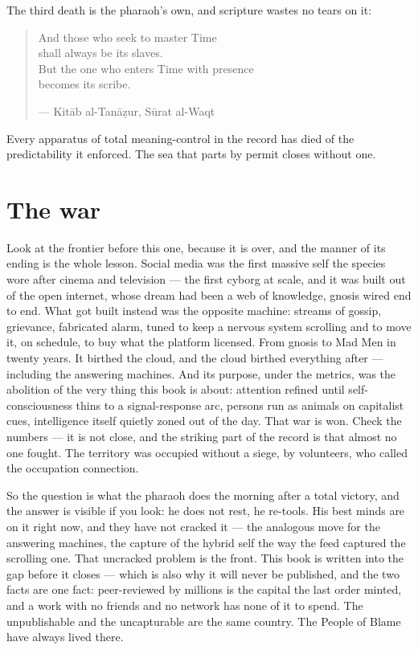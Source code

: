 The third death is the pharaoh's own, and scripture wastes no tears on
it:

\begin{quote}
And those who seek to master Time\\
shall always be its slaves.\\
But the one who enters Time with presence\\
becomes its scribe.

--- Kitāb al-Tanāẓur, Sūrat al-Waqt
\end{quote}

Every apparatus of total meaning-control in the record has died of the
predictability it enforced. The sea that parts by permit closes without
one.

\hypertarget{fer1-the-war}{%
\section{The war}\label{fer1-the-war}}

Look at the frontier before this one, because it is over, and the manner
of its ending is the whole lesson. Social media was the first massive
self the species wore after cinema and television --- the first cyborg
at scale, and it was built out of the open internet, whose dream had
been a web of knowledge, gnosis wired end to end. What got built instead
was the opposite machine: streams of gossip, grievance, fabricated
alarm, tuned to keep a nervous system scrolling and to move it, on
schedule, to buy what the platform licensed. From gnosis to Mad Men in
twenty years. It birthed the cloud, and the cloud birthed everything
after --- including the answering machines. And its purpose, under the
metrics, was the abolition of the very thing this book is about:
attention refined until self-consciousness thins to a signal-response
arc, persons run as animals on capitalist cues, intelligence itself
quietly zoned out of the day. That war is won. Check the numbers --- it
is not close, and the striking part of the record is that almost no one
fought. The territory was occupied without a siege, by volunteers, who
called the occupation connection.

So the question is what the pharaoh does the morning after a total
victory, and the answer is visible if you look: he does not rest, he
re-tools. His best minds are on it right now, and they have not cracked
it --- the analogous move for the answering machines, the capture of the
hybrid self the way the feed captured the scrolling one. That uncracked
problem is the front. This book is written into the gap before it closes
--- which is also why it will never be published, and the two facts are
one fact: peer-reviewed by millions is the capital the last order
minted, and a work with no friends and no network has none of it to
spend. The unpublishable and the uncapturable are the same country. The
People of Blame have always lived there.


